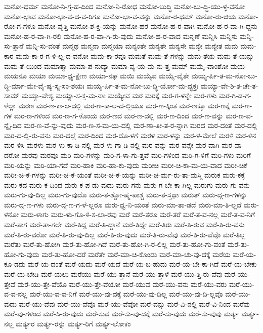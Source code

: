 {ಮನೋ-ಧರ್ಮ
ಮನೋ-ನಿ-ಗ್ರ-ಹ-ದಿಂದ
ಮನೋ-ನಿ-ರೋಧ
ಮನೋ-ಬುದ್ಧಿ
ಮನೋ-ಬು-ದ್ಧಿ-ಯು-ಳ್ಳ-ವನೋ
ಮನೋ-ಭಾವ
ಮನೋ-ಭಾ-ವ-ದ-ವ-ರಿಗೂ
ಮನೋ-ಭಾ-ವ-ವನ್ನು
ಮನೋ-ರ-ಥಮ್
ಮನೋ-ರು-ಚಿಯ
ಮನೋ-ರೋ-ಗ-ಗಳೂ
ಮನೋ-ವೃತ್ತಿ
ಮನೋ-ಶ-ಕ್ತಿ-ಯನ್ನು
ಮನೋ-ಹರ
ಮನೋ-ಹ-ರ-ವಾಗಿ
ಮನೋ-ಹ-ರ-ವಾ-ಗಿ-ದ್ದನು
ಮನೋ-ಹ-ರ-ವಾ-ಗಿ-ರಲಿ
ಮನೋ-ಹ-ರ-ವಾ-ಗಿ-ರು-ವುದು
ಮನೋ-ಹ-ರ-ವಾದ
ಮನ್ನಣೆ
ಮನ್ನಿಸಿ
ಮನ್ನಿಸು
ಮನ್ನಿ-ಸು-ತ್ತಾನೆ
ಮನ್ನಿ-ಸು-ವಂತೆ
ಮನ್ಮಥ
ಮನ್ಮನಾ
ಮನ್ಮಯಾ
ಮನ್ಯಂತೇ
ಮನ್ಯತೇ
ಮನ್ಯಸೇ
ಮನ್ಯೇ
ಮನ್ಯೇತ
ಮಮ
ಮಮ-ಕಾರ
ಮಮ-ಕಾ-ರ-ಗ-ಳಿ-ಲ್ಲ-ದ-ವನೋ
ಮಮ-ಕಾ-ರವೂ
ಮಮತೆ
ಮಮ-ತೆ-ಗಳನ್ನು
ಮಮ-ತೆಯ
ಮಮ-ತೆ-ಯನ್ನು
ಮಮ-ತೆ-ಯಿಂದ
ಮಮಾತ್ಮಾ
ಮಮಾ-ಪ-ನುದ್ಯಾ
ಮಮಾ-ವ್ಯ-ಯ-ಮ-ನು-ತ್ತ-ಮಮ್
ಮಮೈ-ವಾಂಶೋ
ಮಯ
ಮಯನೂ
ಮಯಾ
ಮಯಾ-ಧ್ಯ-ಕ್ಷೇಣ
ಮಯಾ-ನಘ
ಮಯಿ
ಮಯೈವ
ಮಯೈ-ವೈತೇ
ಮಯ್ಯ-ರ್ಪಿ-ತ-ಮ-ನೋ-ಬು-ದ್ಧಿ-ರ್ಮಾ-ಮೇ-ವೈ-ಷ್ಯ-ಸ್ಯ-ಸಂ-ಶಯಃ
ಮಯ್ಯ-ರ್ಪಿ-ತ-ಮ-ನೋ-ಬು-ದ್ಧಿ-ರ್ಯೋ-ಮ-ದ್ಭಕ್ತಃ
ಮಯ್ಯಾ-ವೇ-ಶಿ-ತ-ಚೇ-ತ-ಸಾಮ್
ಮಯ್ಯಾ-ವೇಶ್ಯ
ಮಯ್ಯಾ-ಸ-ಕ್ತ-ಮ-ನಾಃ
ಮಯ್ಯೇವ
ಮರ
ಮರಕ್ಕೆ
ಮರ-ಗ-ಳನ್ನೇ
ಮರ-ಗಳು
ಮರ-ಗಿ-ಡ-ಗ-ಳೆಲ್ಲಾ
ಮರಣ
ಮರ-ಣ-ಕಾ-ಲ-ದಲ್ಲಿ
ಮರ-ಣ-ಕಾ-ಲ-ದ-ಲ್ಲಿಯೂ
ಮರ-ಣ-ಕ್ಕಿಂತ
ಮರ-ಣಕ್ಕೂ
ಮರ-ಣಕ್ಕೆ
ಮರ-ಣ-ಗಳ
ಮರ-ಣ-ಗಳಿಂದ
ಮರ-ಣ-ಗ-ಳೊಂದು
ಮರ-ಣದ
ಮರ-ಣ-ದಲ್ಲಿ
ಮರ-ಣ-ದಿಂದ
ಮರ-ಣ-ವನ್ನು
ಮರ-ಣ-ವ-ನ್ನೈ-ದಿದ
ಮರ-ಣ-ವೆ-ನ್ನು-ವುದು
ಮರ-ಣ-ಸ-ಮ-ಯ-ದಲ್ಲಿ
ಮರ-ಣಾ-ತೀ-ತ-ರ-ನ್ನಾಗಿ
ಮರದ
ಮರ-ದಂತೆ
ಮರ-ದಲ್ಲಿ
ಮರ-ದ-ಲ್ಲಿ-ರು-ವನು
ಮರ-ದಲ್ಲೆ
ಮರ-ದಿಂದ
ಮರ-ದೊ-ಳಗೆ
ಮರಳ
ಮರ-ಳನ್ನು
ಮರ-ಳ-ಮೇಲೆ
ಮರಳಿ
ಮರ-ಳಿನ
ಮರ-ಳಿಸಿ
ಮರಳು
ಮರ-ಳು-ಕಾ-ಡಿ-ನಲ್ಲಿ
ಮರ-ಳು-ಗಾ-ಡಿ-ನಲ್ಲಿ
ಮರ-ವನ್ನು
ಮರ-ವನ್ನೇ
ಮರ-ವಾಗಿ
ಮರ-ವಾ-ದರೋ
ಮರವು
ಮರವೂ
ಮರಿ
ಮರಿ-ಗಳನ್ನು
ಮರಿ-ಗ-ಳಾ-ಗು-ತ್ತವೆ
ಮರಿ-ಗಳಿಂದ
ಮರಿ-ಗ-ಳಿಗೆ
ಮರಿ-ಗಳು
ಮರಿಗೆ
ಮರಿ-ಯನ್ನು
ಮರಿ-ಯಾ-ಗದೆ
ಮರಿ-ಹಾಕಿ
ಮರಿ-ಹಾ-ಕು-ವುದು
ಮರೀಚಿ
ಮರೀ-ಚಿ-ಕಾ-ಮ-ಯ-ವಾದ
ಮರೀ-ಚಿಕೆ
ಮರೀ-ಚಿ-ಕೆ-ಗಳನ್ನು
ಮರೀ-ಚಿ-ಕೆ-ಯಂತೆ
ಮರೀ-ಚಿ-ಕೆ-ಯನ್ನು
ಮರೀ-ಚಿ-ರ್ಮ-ರು-ತಾ-ಮಸ್ಮಿ
ಮರುಕ
ಮರು-ಕಕ್ಕೆ
ಮರು-ಕದ
ಮರು-ಕ-ದಿಂದ
ಮರು-ಕ-ಪ-ಡು-ವುದು
ಮರು-ಗನು
ಮರು-ಗ-ಬೇ-ಕಾ-ಗಿಲ್ಲ
ಮರುಗು
ಮರು-ಗು-ವನು
ಮರು-ಗು-ವು-ದಿಲ್ಲ
ಮರು-ಗು-ವುದೊ
ಮರು-ತ-ಶ್ಚೋ-ಷ್ಮ-ಪಾಶ್ಚ
ಮರು-ತ-ಸ್ತಥಾ
ಮರುತ್
ಮರು-ದ್ಗ-ಣ-ಗಳನ್ನು
ಮರು-ದ್ಗ-ಣ-ಗಳು
ಮರು-ದ್ಗ-ಣ-ಗ-ಳೆ-ಲ್ಲರೂ
ಮರು-ಧ್ವ-ನಿ-ಯಂತೆ
ಮರು-ಮಾ-ತಾ-ಡದೆ
ಮರು-ಮಾ-ತಿ-ಲ್ಲದೆ
ಮರು-ಳನೋ
ಮರು-ಳಾಗು
ಮರು-ಳು-ಗೊ-ಳಿ-ಸ-ಲಾ-ರವು
ಮರೆ
ಮರೆ-ತರೂ
ಮರೆ-ತರೆ
ಮರೆ-ತ-ವ-ನಲ್ಲ
ಮರೆ-ತ-ವ-ನಿಗೆ
ಮರೆ-ತಾಗ
ಮರೆ-ತಾ-ಗಲೇ
ಮರೆ-ತಿದ್ದ
ಮರೆ-ತಿ-ದ್ದಾನೆ
ಮರೆ-ತಿದ್ದೇ
ಮರೆ-ತಿರು
ಮರೆ-ತಿ-ರುವ
ಮರೆ-ತಿ-ರು-ವನು
ಮರೆ-ತಿ-ರು-ವರೋ
ಮರೆ-ತಿ-ರು-ವು-ದಿಲ್ಲ
ಮರೆ-ತಿ-ರು-ವುದು
ಮರೆ-ತಿ-ರು-ವೆವು
ಮರೆ-ತಿ-ರು-ವೆವೊ
ಮರೆ-ತಿಲ್ಲ
ಮರೆತು
ಮರೆ-ತು-ಹೋಗಿ
ಮರೆ-ತು-ಹೋ-ಗಿದೆ
ಮರೆ-ತು-ಹೋ-ಗಿ-ರ-ಲಿಲ್ಲ
ಮರೆ-ತು-ಹೋ-ಗು-ವಂತೆ
ಮರೆ-ತು-ಹೋ-ಗು-ವುದು
ಮರೆ-ತು-ಹೋ-ದರೆ
ಮರೆತೇ
ಮರೆ-ಮಾ-ಚಿ-ಕೊಂಡು
ಮರೆ-ಮಾ-ಚು-ವು-ದಕ್ಕೆ
ಮರೆಯ
ಮರೆ-ಯ-ಕೂ-ಡದು
ಮರೆ-ಯ-ದಂತೆ
ಮರೆ-ಯದು
ಮರೆ-ಯದೆ
ಮರೆ-ಯ-ಬ-ಹುದು
ಮರೆ-ಯ-ಬೇ-ಕಾ-ಗಿದೆ
ಮರೆ-ಯ-ಬೇಕು
ಮರೆ-ಯ-ಬೇಡಿ
ಮರೆ-ಯಲು
ಮರೆಯು
ಮರೆ-ಯು-ತ್ತಾನೆ
ಮರೆ-ಯು-ತ್ತಾಳೆ
ಮರೆ-ಯು-ತ್ತಿ-ರು-ವೆವು
ಮರೆ-ಯು-ತ್ತೇವೆ
ಮರೆ-ಯು-ತ್ತೇ-ವೆಯೊ
ಮರೆ-ಯು-ತ್ತೇ-ವೆಯೋ
ಮರೆ-ಯುವ
ಮರೆ-ಯು-ವನು
ಮರೆ-ಯು-ವರು
ಮರೆ-ಯು-ವ-ವ-ನಲ್ಲ
ಮರೆ-ಯು-ವ-ವ-ನಿಗೆ
ಮರೆ-ಯು-ವು-ದಕ್ಕೆ
ಮರೆ-ಯು-ವು-ದಿಲ್ಲ
ಮರೆ-ಯು-ವು-ದಿ-ಲ್ಲವೊ
ಮರೆ-ಯು-ವುದು
ಮರೆ-ಯು-ವೆವು
ಮರೆ-ಯು-ವೆವೊ
ಮರೆ-ಯು-ವೆವೋ
ಮರೆ-ವನ್ನು
ಮರೆ-ವಿ-ನಲ್ಲಿ
ಮರೆ-ವಿ-ನಿಂದ
ಮರೆವು
ಮರೆ-ವು-ಗಳಿಂದ
ಮರೆ-ಸಿ-ರು-ವುದು
ಮರೆ-ಸುವ
ಮರೆ-ಸು-ವು-ದಕ್ಕೆ
ಮರೆ-ಸು-ವುದು
ಮರೆ-ಸು-ವುವು
ಮರ್ತ್ಯ
ಮರ್ತ್ಯ-ನಲ್ಲ
ಮರ್ತ್ಯರ
ಮರ್ತ್ಯ-ರನ್ನು
ಮರ್ತ್ಯ-ರಿಗೆ
ಮರ್ತ್ಯ-ಲೋಕಂ
}
